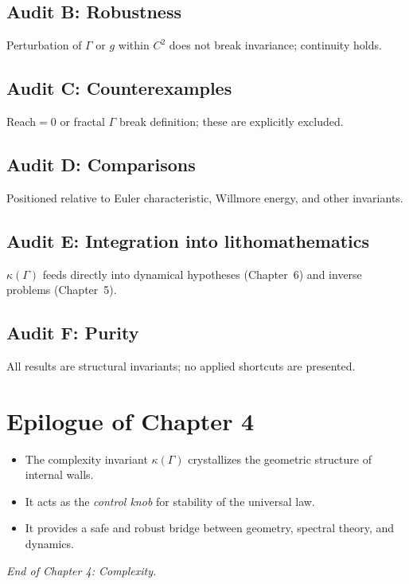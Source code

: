 \subsection*{Audit B: Robustness}
Perturbation of $\Gamma$ or $g$ within $C^2$ does not break invariance; continuity holds.

\subsection*{Audit C: Counterexamples}
Reach$=0$ or fractal $\Gamma$ break definition; these are explicitly excluded.

\subsection*{Audit D: Comparisons}
Positioned relative to Euler characteristic, Willmore energy, and other invariants.

\subsection*{Audit E: Integration into lithomathematics}
$\kappa(\Gamma)$ feeds directly into dynamical hypotheses (Chapter~6) and inverse problems (Chapter~5).

\subsection*{Audit F: Purity}
All results are structural invariants; no applied shortcuts are presented.

\section{Epilogue of Chapter 4}
\label{sec:epilogue-ch4}

\begin{itemize}
  \item The complexity invariant $\kappa(\Gamma)$ crystallizes the geometric structure of internal walls.
  \item It acts as the \emph{control knob} for stability of the universal law.
  \item It provides a safe and robust bridge between geometry, spectral theory, and dynamics.
\end{itemize}

\begin{flushright}
\emph{End of Chapter 4: Complexity.}
\end{flushright}

